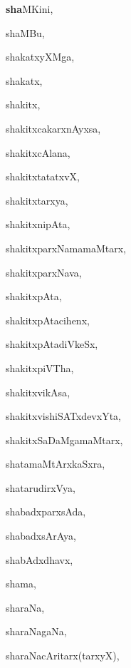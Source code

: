 \begin{multicols}{3}
{\noindent
{{\large\textbf{sha}}MKini}, \pageref{shaMKini}

\noindent
{shaMBu}, \pageref{shaMBu}

\noindent
{shakatxyXMga}, \pageref{shakatxyXMga}

\noindent
{shakatx}, \pageref{shakatx}

\noindent
{shakitx}, \pageref{shakitx}

\noindent
{shakitxcakarxnAyxsa}, \pageref{shakitxcakarxnAyxsa}

\noindent
{shakitxcAlana}, \pageref{shakitxcAlana}

\noindent
{shakitxtatatxvX}, \pageref{shakitxtatatxvX}

\noindent
{shakitxtarxya}, \pageref{shakitxtarxya}

\noindent
{shakitxnipAta}, \pageref{shakitxnipAta}

\noindent
{shakitxparxNamamaMtarx}, \pageref{shakitxparxNamamaMtarx}

\noindent
{shakitxparxNava}, \pageref{shakitxparxNava}

\noindent
{shakitxpAta}, \pageref{shakitxpAta}

\noindent
{shakitxpAtacihenx}, \pageref{shakitxpAtacihenx}

\noindent
{shakitxpAtadiVkeSx}, \pageref{shakitxpAtadiVkeSx}

\noindent
{shakitxpiVTha}, \pageref{shakitxpiVTha}

\noindent
{shakitxvikAsa}, \pageref{shakitxvikAsa}

\noindent
{shakitxvishiSATxdevxYta}, \pageref{shakitxvishiSATxdevxYta}

\noindent
{shakitxSaDaMgamaMtarx}, \pageref{shakitxSaDaMgamaMtarx}

\noindent
{shatamaMtArxkaSxra}, \pageref{shatamaMtArxkaSxra}

\noindent
{shatarudirxVya}, \pageref{shatarudirxVya}

\noindent
{shabadxparxsAda}, \pageref{shabadxparxsAda}

\noindent
{shabadxsArAya}, \pageref{shabadxsArAya}

\noindent
{shabAdxdhavx}, \pageref{shabAdxdhavx}

\noindent
{shama}, \pageref{shama}

\noindent
{sharaNa}, \pageref{sharaNa}

\noindent
{sharaNagaNa}, \pageref{sharaNagaNa}

\noindent
{sharaNacAritarx(tarxyX)}, \pageref{sharaNacAritarxtarxyX}

}
\end{multicols}
